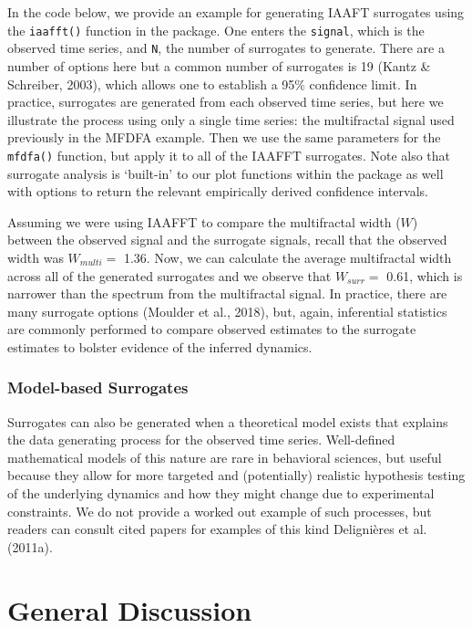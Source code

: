 \documentclass[
  man]{apa6}
\begin{document}
In the code below, we provide an example for generating IAAFT surrogates
using the \texttt{iaafft()} function in the package. One enters the \texttt{signal},
which is the observed time series, and \texttt{N}, the number of surrogates to
generate. There are a number of options here but a common number of
surrogates is 19 (Kantz \& Schreiber, 2003), which allows one to establish a 95\%
confidence limit. In practice, surrogates are generated from each
observed time series, but here we illustrate the process using only a
single time series: the multifractal signal used previously in the MFDFA
example. Then we use the same parameters for the \texttt{mfdfa()} function, but
apply it to all of the IAAFFT surrogates. Note also that surrogate
analysis is `built-in' to our plot functions within the package as well
with options to return the relevant empirically derived confidence
intervals.

Assuming we were using IAAFFT to compare the multifractal width (\(W\))
between the observed signal and the surrogate signals, recall that the
observed width was \(W_{multi} =\)
1.36. Now, we can
calculate the average multifractal width across all of the generated
surrogates and we observe that \(W_{surr} =\) 0.61, which is
narrower than the spectrum from the multifractal signal. In practice,
there are many surrogate options (Moulder et al., 2018), but, again, inferential
statistics are commonly performed to compare observed estimates to the
surrogate estimates to bolster evidence of the inferred dynamics.

\hypertarget{model-based-surrogates}{%
\subsubsection{Model-based Surrogates}\label{model-based-surrogates}}

Surrogates can also be generated when a theoretical model exists that
explains the data generating process for the observed time series.
Well-defined mathematical models of this nature are rare in behavioral
sciences, but useful because they allow for more targeted and
(potentially) realistic hypothesis testing of the underlying dynamics
and how they might change due to experimental constraints. We do not
provide a worked out example of such processes, but readers can consult
cited papers for examples of this kind Delignières et al. (2011a).

\hypertarget{general-discussion}{%
\section{General Discussion}\label{general-discussion}}
\end{document}
